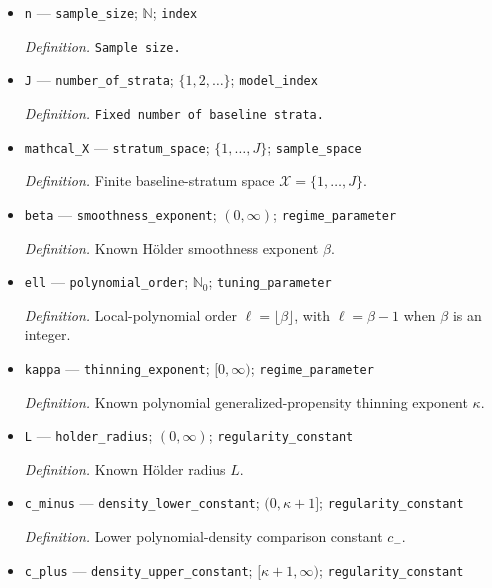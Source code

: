 \documentclass{article}
\begin{document}
\begin{itemize}
  \item \texttt{n} --- \texttt{sample\_\allowbreak{}size}; \(\mathbb N\); \texttt{index}
  \par\smallskip\noindent\emph{Definition.} \texttt{Sample size.}
  \item \texttt{J} --- \texttt{number\_\allowbreak{}of\_\allowbreak{}strata}; \(\{1,2,\ldots\}\); \texttt{model\_\allowbreak{}index}
  \par\smallskip\noindent\emph{Definition.} \texttt{Fixed number of baseline strata.}
  \item \texttt{mathcal\_\allowbreak{}X} --- \texttt{stratum\_\allowbreak{}space}; \(\{1,\ldots,J\}\); \texttt{sample\_\allowbreak{}space}
  \par\smallskip\noindent\emph{Definition.} Finite baseline-stratum space \(\mathcal X=\{1,\ldots,J\}\).
  \item \texttt{beta} --- \texttt{smoothness\_\allowbreak{}exponent}; \((0,\infty)\); \texttt{regime\_\allowbreak{}parameter}
  \par\smallskip\noindent\emph{Definition.} Known Hölder smoothness exponent \(\beta\).
  \item \texttt{ell} --- \texttt{polynomial\_\allowbreak{}order}; \(\mathbb N_0\); \texttt{tuning\_\allowbreak{}parameter}
  \par\smallskip\noindent\emph{Definition.} Local-polynomial order \(\ell=\lfloor\beta\rfloor\), with \(\ell=\beta-1\) when \(\beta\) is an integer.
  \item \texttt{kappa} --- \texttt{thinning\_\allowbreak{}exponent}; \([0,\infty)\); \texttt{regime\_\allowbreak{}parameter}
  \par\smallskip\noindent\emph{Definition.} Known polynomial generalized-propensity thinning exponent \(\kappa\).
  \item \texttt{L} --- \texttt{holder\_\allowbreak{}radius}; \((0,\infty)\); \texttt{regularity\_\allowbreak{}constant}
  \par\smallskip\noindent\emph{Definition.} Known Hölder radius \(L\).
  \item \texttt{c\_\allowbreak{}minus} --- \texttt{density\_\allowbreak{}lower\_\allowbreak{}constant}; \((0,\kappa+1]\); \texttt{regularity\_\allowbreak{}constant}
  \par\smallskip\noindent\emph{Definition.} Lower polynomial-density comparison constant \(c_-\).
  \item \texttt{c\_\allowbreak{}plus} --- \texttt{density\_\allowbreak{}upper\_\allowbreak{}constant}; \([\kappa+1,\infty)\); \texttt{regularity\_\allowbreak{}constant}

\end{itemize}
\end{document}

